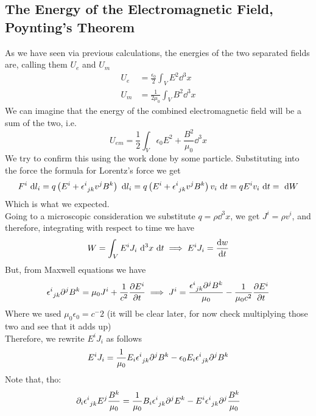 \documentclass[../electromagnetism]{subfiles}
\begin{document}
\subsection{The Energy of the Electromagnetic Field, Poynting's Theorem}
As we have seen via previous calculations, the energies of the two separated fields are, calling them $U_e$ and $U_m$
\begin{equation}
	\begin{aligned}
		U_e&=\frac{\epsilon_0}{2}\int_VE^2\dd^3x\\
		U_m&=\frac{1}{2\mu_0}\int_VB^2\dd^3x
	\end{aligned}
	\label{eq:fieldenergies}
\end{equation}
We can imagine that the energy of the combined electromagnetic field will be a sum of the two, i.e.
\begin{equation}
	U_{em}=\frac{1}{2}\int_V\epsilon_0E^2+\frac{B^2}{\mu_0}\dd^3x
	\label{eq:emfieldenergy}
\end{equation}
We try to confirm this using the work done by some particle. Substituting into the force the formula for Lorentz's force we get
\begin{equation*}
	F^i\ \mathrm{d} l_i=q\left( E^i+\epsilon^{i}_{\ jk}v^jB^k \right)\ \mathrm{d} l_i=q\left( E^i+\epsilon^{i}_{\ jk}v^jB^k \right)v_i\ \mathrm{d} t=qE^iv_i\ \mathrm{d} t=\ \mathrm{d} W
\end{equation*}
Which is what we expected.\\
Going to a microscopic consideration we substitute $q=\rho\dd^3x$, we get $J^i=\rho v^i$, and therefore, integrating with respect to time we have
\begin{equation*}
	W=\int_VE^iJ_i\ \mathrm{d}^3x\ \mathrm{d} t\implies E^iJ_i=\dv{w}{t}
\end{equation*}
But, from Maxwell equations we have
\begin{equation*}
	\epsilon^{i}_{\ jk}\partial^jB^k=\mu_0J^i+\frac{1}{c^2}\pdv{E^i}{t}\implies J^i=\frac{\epsilon^{i}_{\ jk}\partial^jB^k}{\mu_0}-\frac{1}{\mu_0c^2}\pdv{E^i}{t}
\end{equation*}
Where we used $\mu_0\epsilon_0=c^-2$ (it will be clear later, for now check multiplying those two and see that it adds up)\\
Therefore, we rewrite $E^iJ_i$ as follows
\begin{equation*}
	E^iJ_i=\frac{1}{\mu_0}E_i\epsilon^{i}_{\ jk}\partial^jB^k-\epsilon_0E_i\epsilon^{i}_{\ jk}\partial^jB^k
\end{equation*}
Note that, tho:
\begin{equation*}
	\partial_i\epsilon^{i}_{\ jk}E^j\frac{B^k}{\mu_0}=\frac{1}{\mu_0}B_i\epsilon^{i}_{\ jk}\partial^jE^k-E^i\epsilon^{i}_{\ jk}\partial^j\frac{B^k}{\mu_0}
\end{equation*}
\end{document}
